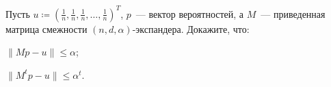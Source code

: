 Пусть $u \coloneqq (\frac{1}{n}, \frac{1}{n}, \frac{1}{n}, \dots, \frac{1}{n})^{T}$, $p$~--- вектор
вероятностей, а $M$~--- приведенная матрица смежности $(n, d, \alpha)$-экспандера. Докажите, что:
\begin{enumcyr}
    \item $\|M p - u\| \le \alpha$;
    \item $\|M^t p - u\| \le \alpha^t$.
\end{enumcyr}